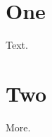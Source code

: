 \documentclass{book}
\begin{document}
\tableofcontents\chapter{One}Text.\chapter{Two}More.
\end{document}

